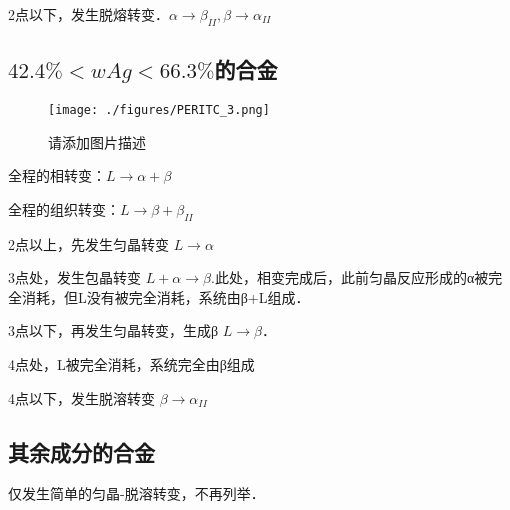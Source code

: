 2点以下，发生脱熔转变．$\alpha \rightarrow \beta_{II}, \beta \rightarrow \alpha_{II}$

\subsection{$42.4\%<wAg<66.3\%$的合金}
\begin{figure}[ht]
\centering
\texttt{[image: ./figures/PERITC\_3.png]}
\caption{请添加图片描述} \label{PERITC_fig3}
\end{figure}
全程的相转变：$L \rightarrow \alpha+\beta$

全程的组织转变：$L \rightarrow \beta + \beta_{II}$

2点以上，先发生匀晶转变 $L \rightarrow \alpha$

3点处，发生包晶转变 $L + \alpha \rightarrow \beta$.此处，相变完成后，此前匀晶反应形成的α被完全消耗，但L没有被完全消耗，系统由β+L组成．

3点以下，再发生匀晶转变，生成β $L \rightarrow \beta$．

4点处，L被完全消耗，系统完全由β组成

4点以下，发生脱溶转变 $\beta \rightarrow \alpha_{II}$

\subsection{其余成分的合金}
仅发生简单的匀晶-脱溶转变，不再列举．

